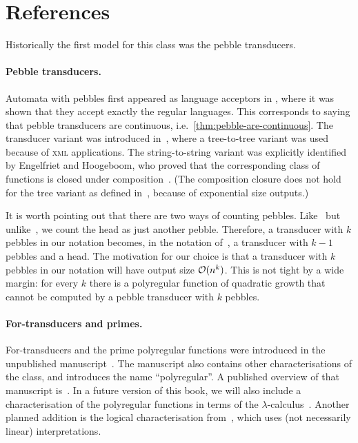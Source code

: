 \section{References}
\label{sec:polyregular-bib}


Historically the first model for this class was the pebble transducers. 

\paragraph*{Pebble transducers.}  Automata with pebbles first appeared as language acceptors in \cite[Definition 4.1]{lewenstein1996}, where it was shown that they accept exactly the regular languages\cite[Theorem 4.2]{lewenstein1996}. This corresponds to saying that pebble transducers are continuous, i.e.~\cref{thm:pebble-are-continuous}. The transducer variant was introduced in~\cite[Section 3.1]{milo2003}, where a  tree-to-tree variant was used because of \textsc{xml} applications. The string-to-string variant was explicitly identified by Engelfriet and Hoogeboom, who proved that the corresponding class of functions is closed under composition~\cite[Theorem 2]{engelfriet2002}. (The composition closure does not hold for the tree variant as defined in~\cite{milo2003}, because of exponential size outputs.)

It is worth pointing out that there are two ways of counting pebbles.
Like~\cite{milo2003} but unlike~\cite{lewenstein1996, engelfriet2002}, we count the head as just another pebble. Therefore, a transducer with $k$ pebbles in our notation becomes, in the notation  of~\cite{lewenstein1996, engelfriet2002}, a transducer with $k-1$ pebbles and a head. The motivation for our choice is that a transducer with $k$ pebbles in our notation will have output size ${\mathcal O}(n^k)$. This is not tight by a wide margin:  for every $k$ there is a polyregular function of quadratic growth that cannot be computed by a pebble transducer with $k$ pebbles\cite[Theorem 3.3]{bojanczyk2022}.

\paragraph*{For-transducers and primes.}
For-transducers and the prime polyregular functions were introduced in the unpublished manuscript~\cite[Sections 1 and 3]{bojanczykPolyregularFunctions2018}. The manuscript also contains other characterisations of the class, and introduces the name ``polyregular''. A published overview of that manuscript is~\cite{bojanczyk2022}. In a future version of this book, we will also include a characterisation of the polyregular functions in terms of the $\lambda$-calculus~\cite[Section 4]{bojanczykPolyregularFunctions2018}. Another planned addition is the  logical characterisation from~\cite[Theorem 7]{bojanczykKieferLhote2019}, which uses (not necessarily linear) \mso interpretations.


